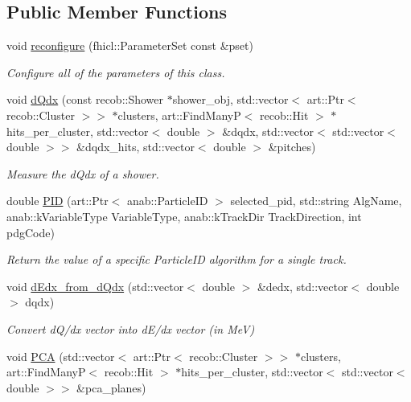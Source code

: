 \subsection*{Public Member Functions}
\begin{DoxyCompactItemize}
\item 
void \hyperlink{group__lee_ga4523185d78d6b7aa94dbf26475750282}{reconfigure} (fhicl\-::\-Parameter\-Set const \&pset)
\begin{DoxyCompactList}\small\item\em Configure all of the parameters of this class. \end{DoxyCompactList}\item 
void \hyperlink{group__lee_ga83891d9231c431e99e7615d02d570047}{d\-Qdx} (const recob\-::\-Shower $\ast$shower\-\_\-obj, std\-::vector$<$ art\-::\-Ptr$<$ recob\-::\-Cluster $>$$>$ $\ast$clusters, art\-::\-Find\-Many\-P$<$ recob\-::\-Hit $>$ $\ast$hits\-\_\-per\-\_\-cluster, std\-::vector$<$ double $>$ \&dqdx, std\-::vector$<$ std\-::vector$<$ double $>$$>$ \&dqdx\-\_\-hits, std\-::vector$<$ double $>$ \&pitches)
\begin{DoxyCompactList}\small\item\em Measure the d\-Qdx of a shower. \end{DoxyCompactList}\item 
double \hyperlink{group__lee_gab3e573f8d2d733f94b8ca862d7343864}{P\-I\-D} (art\-::\-Ptr$<$ anab\-::\-Particle\-I\-D $>$ selected\-\_\-pid, std\-::string Alg\-Name, anab\-::k\-Variable\-Type Variable\-Type, anab\-::k\-Track\-Dir Track\-Direction, int pdg\-Code)
\begin{DoxyCompactList}\small\item\em Return the value of a specific Particle\-I\-D algorithm for a single track. \end{DoxyCompactList}\item 
void \hyperlink{group__lee_ga2844c7f27f79fbe5e16d9c674ca4afa1}{d\-Edx\-\_\-from\-\_\-d\-Qdx} (std\-::vector$<$ double $>$ \&dedx, std\-::vector$<$ double $>$ dqdx)
\begin{DoxyCompactList}\small\item\em Convert d\-Q/dx vector into d\-E/dx vector (in Me\-V) \end{DoxyCompactList}\item 
void \hyperlink{group__lee_gac5f41d2b1bee9a0f761179f3059f8a49}{P\-C\-A} (std\-::vector$<$ art\-::\-Ptr$<$ recob\-::\-Cluster $>$$>$ $\ast$clusters, art\-::\-Find\-Many\-P$<$ recob\-::\-Hit $>$ $\ast$hits\-\_\-per\-\_\-cluster, std\-::vector$<$ std\-::vector$<$ double $>$$>$ \&pca\-\_\-planes)

\end{DoxyCompactItemize}
